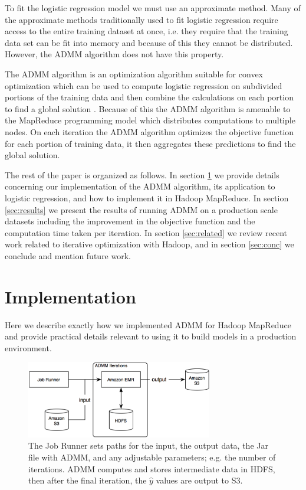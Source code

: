 \documentclass[10pt, conference, compsocconf]{IEEEtran}
\begin{document}
To fit the logistic regression model we must use an approximate method.  Many of the approximate methods traditionally used to fit logistic regression require access to the entire training dataset at once, i.e. they require that the training data set can be fit into memory and because of this they cannot be distributed.  However, the ADMM algorithm does not have this property.

The ADMM algorithm is an optimization algorithm suitable for convex optimization which can be used to compute logistic regression on subdivided portions of the training data and then combine the calculations on each portion to find a global solution \cite{boyd}.  Because of this the ADMM algorithm is amenable to the MapReduce programming model which distributes computations to multiple nodes.  On each iteration the ADMM algorithm optimizes the objective function for each portion of training data, it then aggregates these predictions to find the global solution.

The rest of the paper is organized as follows.  In section \ref{sec:imp} we provide details concerning our implementation of the ADMM algorithm, its application to logistic regression, and how to implement it in Hadoop MapReduce.  In section \ref{sec:results} we present the results of running ADMM on a production scale datasets including the improvement in the objective function and the computation time taken per iteration.  In section \ref{sec:related} we review recent work related to iterative optimization with Hadoop, and in section \ref{sec:conc} we conclude and mention future work.

\section{Implementation}\label{sec:imp}
Here we describe exactly how we implemented ADMM for Hadoop MapReduce and provide practical details relevant to using it to build models in a production environment.

\begin{figure}[!t]
\centering
\includegraphics[width=3.2in]{aws_implementation}
\caption{The Job Runner sets paths for the input, the output data, the Jar file with ADMM, and any adjustable parameters; e.g. the number of iterations.  ADMM computes and stores intermediate data in HDFS, then after the final iteration, the $\hat{y}$ values are output to S3.}
\label{workflow}
\end{figure}
\end{document}
